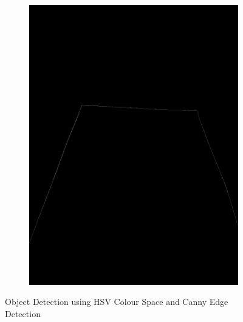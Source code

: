 \documentclass[a4paper,12pt]{article}
\begin{document}
\begin{appendices}
\begin{figure}[H]
\begin{subfigure}{.5\textwidth}
		\includegraphics[width=.98\textwidth]{2-1}
	\end{subfigure}
	\caption{\label{redshadow} Object Detection using HSV Colour Space and Canny Edge Detection  }
\end{figure}
\begin{figure}[H]
	\centering
	\begin{subfigure}{.5\textwidth}
		\centering

\end{subfigure}
\end{figure}
\end{appendices}
\end{document}
